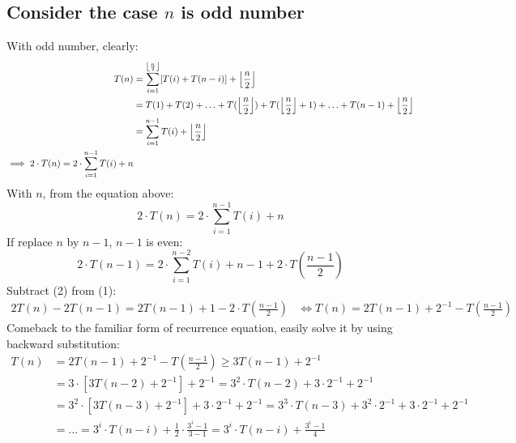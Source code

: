 \documentclass[a4paper]{article}
\DeclarePairedDelimiter\floor{\lfloor}{\rfloor}
\begin{document}
\subsection{Consider the case $n$ is odd number}
With odd number, clearly: 
\begin{equation*}
    \begin{aligned}
        T(n) & = \sum_{i=1}^{\floor*{\frac{n}{2}}}[T(i) + T(n-i)] + \floor*{\frac{n}{2}} \\
        & = T(1)+T(2) + \ldots + T(\floor*{\frac{n}{2}}) + T(\floor*{\frac{n}{2}}+1) + \ldots + T(n-1) + \floor*{\frac{n}{2}}  \\ 
        & = \sum_{i=1}^{n-1}{T(i)} + \floor*{\frac{n}{2}} \\
        \implies 2 \cdot T(n) = 2 \cdot \sum_{i=1}^{n-1}{T(i)} + n 
    \end{aligned}
\end{equation*}
With $n$, from the equation above: 
\begin{equation}
    2 \cdot T(n) = 2 \cdot \sum_{i=1}^{n-1}{T(i)} + n 
\end{equation}
If replace $n$ by $n-1$, $n-1$ is even:
\begin{equation}
    2 \cdot T(n-1) = 2 \cdot \sum_{i=1}^{n-2}{T(i)} + n-1 + 2 \cdot T(\frac{n-1}{2})
\end{equation}
Subtract (2) from (1): 
\begin{equation*}
    \begin{aligned}
        2T(n) - 2T(n-1) = 2T(n-1) + 1 -  2 \cdot T(\frac{n-1}{2})
        & \Leftrightarrow T(n) = 2T(n-1) + 2^{-1} - T(\frac{n-1}{2})
    \end{aligned}
\end{equation*}
Comeback to the familiar form of recurrence equation, easily solve it by using backward substitution: 
\begin{equation*}
    \begin{aligned}
        T(n) & = 2T(n-1) + 2^{-1}  - T(\frac{n-1}{2}) \geq 3T(n-1)+2^{-1}\\
        & = 3 \cdot [3T(n-2) + 2^{-1}] + 2^{-1} = 3^2 \cdot T(n-2) + 3\cdot2^{-1} + 2^{-1} \\ 
        & = 3^2 \cdot[3T(n-3) + 2^{-1}] + 3\cdot2^{-1} + 2^{-1}  = 3^3 \cdot T(n-3) + 3^2\cdot2^{-1}+3\cdot2^{-1}+2^{-1} \\
        & = \ldots = 3^i \cdot T(n-i) + \frac{1}{2} \cdot \frac{3^i-1}{3-1} = 3^i \cdot T(n-i) + \frac{3^i-1}{4}
    \end{aligned}
\end{equation*}
\end{document}
